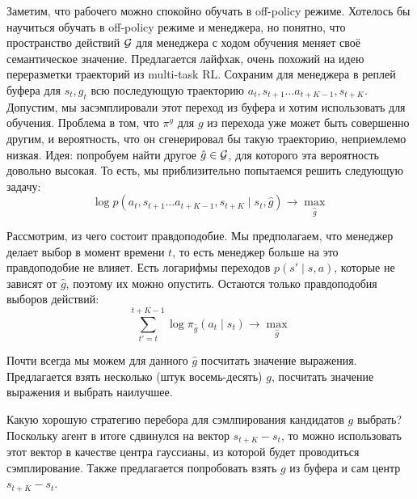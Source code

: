 Заметим, что рабочего можно спокойно обучать в off-policy режиме. Хотелось бы научиться обучать в off-policy режиме и менеджера, но понятно, что пространство действий $\mathcal{G}$ для менеджера с ходом обучения меняет своё семантическое значение. Предлагается лайфхак, очень похожий на идею переразметки траекторий из multi-task RL. Сохраним для менеджера в реплей буфера для $s_t, g_t$ всю последующую траекторию $a_t, s_{t+1} \dots a_{t + K - 1}, s_{t + K}$. Допустим, мы засэмплировали этот переход из буфера и хотим использовать для обучения. Проблема в том, что $\pi^g$ для $g$ из перехода уже может быть совершенно другим, и вероятность, что он сгенерировал бы такую траекторию, неприемлемо низкая. Идея: попробуем найти другое $\hat{g} \in \mathcal{G}$, для которого эта вероятность довольно высокая. То есть, мы приблизительно попытаемся решить следующую задачу:
$$\log p(a_t, s_{t+1} \dots a_{t + K - 1}, s_{t + K} \mid s_t, \hat{g}) \to \max_{\hat{g}}$$

Рассмотрим, из чего состоит правдоподобие. Мы предполагаем, что менеджер делает выбор в момент времени $t$, то есть менеджер больше на это правдоподобие не влияет. Есть логарифмы переходов $p(s' \mid s, a)$, которые не зависят от $\hat{g}$, поэтому их можно опустить. Остаются только правдоподобия выборов действий:
$$\sum_{t' = t}^{t + K - 1} \log \pi_{\hat{g}}(a_t \mid s_t) \to \max_{\hat{g}}$$

Почти всегда мы можем для данного $\hat{g}$ посчитать значение выражения. Предлагается взять несколько (штук восемь-десять) $g$, посчитать значение выражения и выбрать наилучшее. 

Какую хорошую стратегию перебора для сэмлпирования кандидатов $g$ выбрать? Поскольку агент в итоге сдвинулся на вектор $s_{t + K} - s_t$, то можно использовать этот вектор в качестве центра гауссианы, из которой будет проводиться сэмплирование. Также предлагается попробовать взять $g$ из буфера и сам центр $s_{t + K} - s_t$.